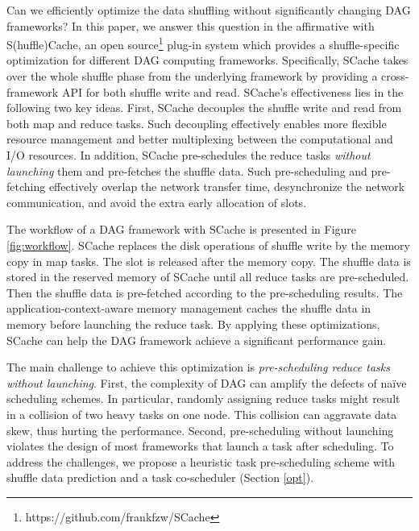 Can we efficiently optimize the data shuffling without significantly changing DAG frameworks?
In this paper, we answer this question in the affirmative with S(huffle)Cache, an open source\footnote{https://github.com/frankfzw/SCache} plug-in system which provides a shuffle-specific optimization for different DAG computing frameworks.
Specifically, SCache takes over the whole shuffle phase from the underlying framework by providing a cross-framework API for both shuffle write and read.
SCache's effectiveness lies in the following two key ideas.
First, SCache decouples the shuffle write and read from both map and reduce tasks.
Such decoupling effectively enables more flexible resource management and better multiplexing between the computational and I/O resources.
In addition, SCache pre-schedules the reduce tasks \emph{without launching} them and pre-fetches the shuffle data. 
Such pre-scheduling and pre-fetching effectively overlap the network transfer time, desynchronize the network communication, 
and avoid the extra early allocation of slots.

The workflow of a DAG framework with SCache is presented in Figure \ref{fig:workflow}. 
SCache replaces the disk operations of shuffle write by the memory copy in map tasks. 
The slot is released after the memory copy. 
The shuffle data is stored in the reserved memory of SCache until all reduce tasks are pre-scheduled. 
Then the shuffle data is pre-fetched according to the pre-scheduling results.  
The application-context-aware memory management caches the shuffle data in memory before launching the reduce task.
By applying these optimizations, SCache can help the DAG framework achieve a significant performance gain.  

The main challenge to achieve this optimization is \textit{pre-scheduling reduce tasks without launching}. 
First, the complexity of DAG can amplify the defects of na\"{i}ve scheduling schemes. 
In particular, randomly assigning reduce tasks might result in a collision of two heavy tasks on one node. 
This collision can aggravate data skew, thus hurting the performance. 
Second, pre-scheduling without launching violates the design of most frameworks that launch a task after scheduling.
To address the challenges, we propose a heuristic task pre-scheduling scheme with shuffle data prediction and a task co-scheduler (Section \ref{opt}).

